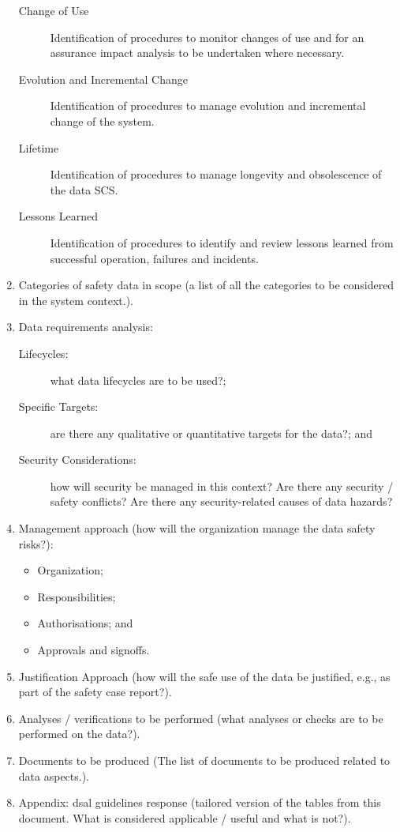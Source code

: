 \begin{enumerate}
\begin{description}
    \item[Change of Use]Identification of procedures to monitor changes of use and for an assurance impact analysis to be undertaken  where necessary.
    \item[Evolution and Incremental Change]Identification of procedures to manage evolution and incremental change of the system.
    \item[Lifetime]Identification of procedures to manage longevity and obsolescence of the data SCS.
    \item[Lessons Learned]Identification of procedures to identify and review lessons learned from successful operation, failures and incidents.
  \end{description}
\item
  Categories
  of safety data in scope (a list of all the categories to be considered in the system context.).
  \item Data requirements analysis:
  \begin{description}
    \item[Lifecycles:] what data lifecycles are to be used?;
    \item[Specific Targets:] are there any qualitative or quantitative targets for the data?; and
    \item[Security Considerations:] how will security be managed in this context? Are there any security / safety conflicts? Are there any security-related causes of data \glspl{hazard}?
  \end{description}
  \item Management approach (how will the organization manage the data safety risks?):
  \begin{itemize}
    \item Organization;
    \item Responsibilities;
    \item Authorisations; and
    \item Approvals and signoffs.
  \end{itemize}
  \item Justification Approach (how will the safe use of the data be justified, e.g., as part of the safety case report?). 
  \item Analyses / \glspl{verification} to be performed (what analyses or checks are to be performed on the data?).
  \item Documents to be produced (The list of documents to be produced related to data aspects.).
  \item Appendix: \gls{dsal} guidelines response (tailored version of the tables from this document. What is considered applicable / useful and what is not?).
\end{enumerate}
